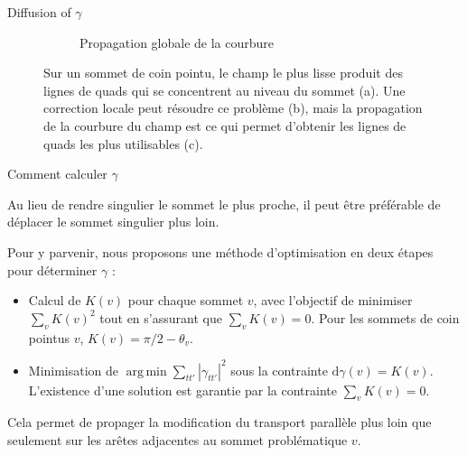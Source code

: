\documentclass{beamer}
\DeclareMathOperator*{\argmin}{arg\,min}
\begin{document}
\begin{frame}{Diffusion of $\gamma$}
\begin{figure}
\begin{subfigure}{.3\textwidth}
      \caption{Propagation globale de la courbure}
    \end{subfigure}%
    \caption{Sur un sommet de coin pointu, le champ le plus lisse produit des lignes de quads qui se concentrent au niveau du sommet (a). Une correction locale peut 
    résoudre ce problème (b), mais la propagation de la courbure du champ est ce qui permet d'obtenir les lignes de quads les plus utilisables (c).}
    \label{fig:cadff:sharp2}
    \end{figure}
    
\end{frame}
    
\begin{frame}{Comment calculer $\gamma$}

    Au lieu de rendre singulier le sommet le plus proche, il peut être préférable de déplacer le sommet singulier plus loin.
    
    Pour y parvenir, nous proposons une méthode d'optimisation en deux étapes pour déterminer $\gamma$ :
    \begin{itemize}
        \item Calcul de $K(v)$ pour chaque sommet $v$, avec l'objectif de minimiser $\sum_v K(v)^2$ tout en s'assurant que $\sum_v K(v)=0$. Pour les sommets de coin pointus $v$, $K(v) = \pi/2 - \theta_v$.
        \item Minimisation de $\argmin \sum_{tt'}|\gamma_{tt'}|^2$ sous la contrainte $\mathrm{d}\gamma(v) = K(v)$. L'existence d'une solution est garantie par la contrainte $\sum_v K(v)=0$.
    \end{itemize}
    
    Cela permet de propager la modification du transport parallèle plus loin que seulement sur les arêtes adjacentes au sommet problématique $v$.
    
\end{frame}
\end{document}
